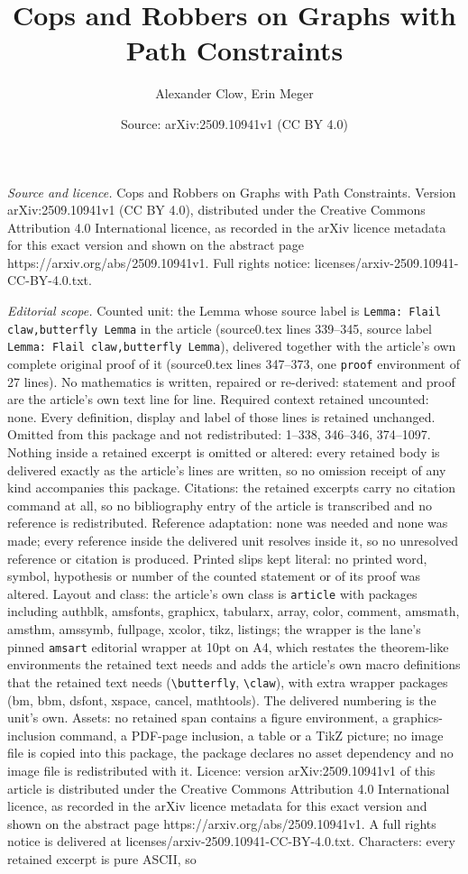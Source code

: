 \documentclass[10pt,a4paper]{amsart}
\title[Cops and Robbers on Graphs with Path Constraints]{Cops and Robbers on Graphs with Path Constraints}
\author{Alexander Clow, Erin Meger}
\date{Source: arXiv:2509.10941v1 (CC BY 4.0)}
\begin{document}
\maketitle

\noindent\emph{Source and licence.} Cops and Robbers on Graphs with Path Constraints. Version arXiv:2509.10941v1 (CC BY 4.0), distributed under the Creative Commons Attribution 4.0 International licence, as recorded in the arXiv licence metadata for this exact version and shown on the abstract page https://arxiv.org/abs/2509.10941v1. Full rights notice: licenses/arxiv-2509.10941-CC-BY-4.0.txt.\par\smallskip

\noindent\textit{Editorial scope.} Counted unit: the Lemma whose source label is \texttt{Lemma: Flail claw,butterfly Lemma} in the article (source0.tex lines 339--345, source label \texttt{Lemma: Flail claw,butterfly Lemma}), delivered together with the article's own complete original proof of it (source0.tex lines 347--373, one \texttt{proof} environment of 27 lines). No mathematics is written, repaired or re-derived: statement and proof are the article's own text line for line. Required context retained uncounted: none. Every definition, display and label of those lines is retained unchanged. Omitted from this package and not redistributed: 1--338, 346--346, 374--1097. Nothing inside a retained excerpt is omitted or altered: every retained body is delivered exactly as the article's lines are written, so no omission receipt of any kind accompanies this package. Citations: the retained excerpts carry no citation command at all, so no bibliography entry of the article is transcribed and no reference is redistributed. Reference adaptation: none was needed and none was made; every reference inside the delivered unit resolves inside it, so no unresolved reference or citation is produced. Printed slips kept literal: no printed word, symbol, hypothesis or number of the counted statement or of its proof was altered. Layout and class: the article's own class is \texttt{article} with packages including authblk, amsfonts, graphicx, tabularx, array, color, comment, amsmath, amsthm, amssymb, fullpage, xcolor, tikz, listings; the wrapper is the lane's pinned \texttt{amsart} editorial wrapper at 10pt on A4, which restates the theorem-like environments the retained text needs and adds the article's own macro definitions that the retained text needs (\texttt{\textbackslash butterfly}, \texttt{\textbackslash claw}), with extra wrapper packages (bm, bbm, dsfont, xspace, cancel, mathtools). The delivered numbering is the unit's own. Assets: no retained span contains a figure environment, a graphics-inclusion command, a PDF-page inclusion, a table or a TikZ picture; no image file is copied into this package, the package declares no asset dependency and no image file is redistributed with it. Licence: version arXiv:2509.10941v1 of this article is distributed under the Creative Commons Attribution 4.0 International licence, as recorded in the arXiv licence metadata for this exact version and shown on the abstract page https://arxiv.org/abs/2509.10941v1. A full rights notice is delivered at licenses/arxiv-2509.10941-CC-BY-4.0.txt. Characters: every retained excerpt is pure ASCII, so 
\end{document}
